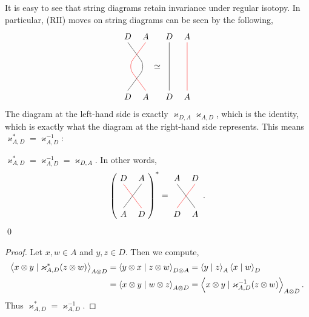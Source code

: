 It is easy to see that string diagrams retain invariance under regular isotopy.
In particular, (RII) moves on string diagrams can be seen by the following,
\[\begin{tikzpicture}[rotate=90,
      xshift=-1cm,
      baseline=-\dimexpr\fontdimen22\textfont2\relax]
      \draw[rounded corners=0.35cm, red] (0,0)--(1,0.75)--(2,0);
      \draw[rounded corners=0.35cm] (2,0.75) -- (1,0)--(0,0.75);
      \path (-0.25,0) node[font=\normalsize] {$A$};
      \path (-0.25,0.75) node[font=\normalsize] {$D$};
      \path (2.25,0) node[font=\normalsize] {$A$};
      \path (2.25,0.75) node[font=\normalsize] {$D$};
     \end{tikzpicture}\simeq\begin{tikzpicture}[rotate=90,
      xshift=-1cm,
      baseline=-\dimexpr\fontdimen22\textfont2\relax]
      \draw[red] (0,0)--(2,0);
      \draw (0,0.75)--(2,0.75);
      \path (-0.25,0) node[font=\normalsize] {$A$};
      \path (-0.25,0.75) node[font=\normalsize] {$D$};
      \path (2.25,0) node[font=\normalsize] {$A$};
      \path (2.25,0.75) node[font=\normalsize] {$D$};
     \end{tikzpicture}\]
The diagram at the left-hand side is exactly $\varkappa_{D,A}\varkappa_{A,D}$, which is the identity, which is exactly what the diagram at the right-hand side represents. This means $\varkappa_{A,D}^*=\varkappa^{-1}_{A,D}$:
\begin{proposition}\label{tensor_product.comm_adjoint}
 $\varkappa_{A,D}^*=\varkappa^{-1}_{A,D}=\varkappa_{D,A}$.
 In other words,
 \[{\left(\begin{tikzpicture}[rotate=90,
      xshift=-0.5cm,
      baseline=-\dimexpr\fontdimen22\textfont2\relax]
      \draw[red] (0,0)--(1,0.75);
      \draw (1,0)--(0,0.75);
      \path (-0.25,0) node[font=\normalsize] {$D$};
      \path (-0.25,0.75) node[font=\normalsize] {$A$};
      \path (1.25,0) node[font=\normalsize] {$A$};
      \path (1.25,0.75) node[font=\normalsize] {$D$};
     \end{tikzpicture}\right)}^*=\begin{tikzpicture}[rotate=90,
      xshift=-0.5cm,
      baseline=-\dimexpr\fontdimen22\textfont2\relax]
      \draw (0,0)--(1,0.75);
      \draw[red] (1,0)--(0,0.75);
      \path (-0.25,0) node[font=\normalsize] {$A$};
      \path (-0.25,0.75) node[font=\normalsize] {$D$};
      \path (1.25,0) node[font=\normalsize] {$D$};
      \path (1.25,0.75) node[font=\normalsize] {$A$};
     \end{tikzpicture}\,.\]\qed
\end{proposition}
\begin{proof}
 Let $x,w\in A$ and $y,z\in D$. Then we compute,
 \begin{align*}
  \left\langle x\otimes{y} \mid \varkappa_{A,D}^*(z\otimes{w})\right\rangle_{A\otimes D} &= \left\langle y\otimes{x} \mid z\otimes{w}\right\rangle_{D \otimes A}
  = \left\langle y \mid z\right\rangle_{A}\left\langle x \mid w\right\rangle_{D}\\
  &= \left\langle x\otimes{y} \mid w\otimes{z}\right\rangle_{A \otimes D}
  = \left\langle x\otimes{y} \mid \varkappa_{A,D}^{-1}(z\otimes{w})\right\rangle_{A\otimes D}.
 \end{align*}
 Thus $\varkappa_{A,D}^*=\varkappa_{A,D}^{-1}$.
\end{proof}

